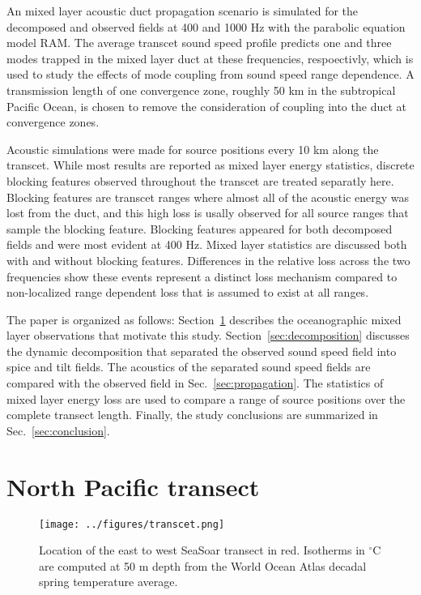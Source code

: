 \documentclass[preprint,NumberedRefs]{JASA}
\begin{document}
An mixed layer acoustic duct propagation scenario is simulated for the decomposed and observed fields at 400 and 1000 Hz with the parabolic equation model RAM\cite{collins93}. The average transcet sound speed profile predicts one and three modes trapped in the mixed layer duct at these frequencies, respoectivly, which is used to study the effects of mode coupling from sound speed range dependence. A transmission length of one convergence zone\citep{jensen2011computational}, roughly 50 km in the subtropical Pacific Ocean, is chosen to remove the consideration of coupling into the duct at convergence zones\citep{colosi2020observations}.

Acoustic simulations were made for source positions every 10 km along the transcet. While most results are reported as mixed layer energy statistics, discrete blocking features\citep{colosi2020observations} observed throughout the transcet are treated separatly here. Blocking features are transcet ranges where almost all of the acoustic energy was lost from the duct, and this high loss is usally observed for all source ranges that sample the blocking feature. Blocking features appeared for both decomposed fields and were most evident at 400 Hz. Mixed layer statistics are discussed both with and without blocking features. Differences in the relative loss across the two frequencies show these events represent a distinct loss mechanism compared to non-localized range dependent loss that is assumed to exist at all ranges.

The paper is organized as follows: Section~\ref{sec:transcet} describes the oceanographic mixed layer observations that motivate this study. Section~\ref{sec:decomposition} discusses the dynamic decomposition that separated the observed sound speed field into spice and tilt fields. The acoustics of the separated sound speed fields are compared with the observed field in Sec.~\ref{sec:propagation}. The statistics of mixed layer energy loss are used to compare a range of source positions over the complete transect length. Finally, the study conclusions are summarized in Sec.~\ref{sec:conclusion}.

\section{North Pacific transect}\label{sec:transcet}
\begin{figure}
\texttt{[image: ../figures/transcet.png]}
    \caption{\label{fig:transcet}{Location of the east to west SeaSoar transect in red. Isotherms in $^\circ$C are computed at 50 m depth from the World Ocean Atlas decadal spring temperature average\citep{WOA}.}}
\end{figure}
\end{document}
